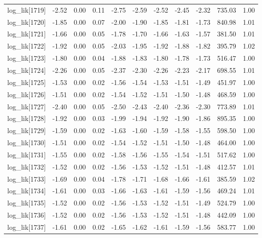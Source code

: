 \begin{table}[ht]
\begin{tabular}{rrrrrrrrrrr}
  log\_lik[1719] & -2.52 & 0.00 & 0.11 & -2.75 & -2.59 & -2.52 & -2.45 & -2.32 & 735.03 & 1.00 \\ 
  log\_lik[1720] & -1.85 & 0.00 & 0.07 & -2.00 & -1.90 & -1.85 & -1.81 & -1.73 & 840.98 & 1.01 \\ 
  log\_lik[1721] & -1.66 & 0.00 & 0.05 & -1.78 & -1.70 & -1.66 & -1.63 & -1.57 & 381.50 & 1.01 \\ 
  log\_lik[1722] & -1.92 & 0.00 & 0.05 & -2.03 & -1.95 & -1.92 & -1.88 & -1.82 & 395.79 & 1.02 \\ 
  log\_lik[1723] & -1.80 & 0.00 & 0.04 & -1.88 & -1.83 & -1.80 & -1.78 & -1.73 & 516.47 & 1.00 \\ 
  log\_lik[1724] & -2.26 & 0.00 & 0.05 & -2.37 & -2.30 & -2.26 & -2.23 & -2.17 & 698.55 & 1.01 \\ 
  log\_lik[1725] & -1.53 & 0.00 & 0.02 & -1.56 & -1.54 & -1.53 & -1.51 & -1.49 & 451.97 & 1.00 \\ 
  log\_lik[1726] & -1.51 & 0.00 & 0.02 & -1.54 & -1.52 & -1.51 & -1.50 & -1.48 & 468.59 & 1.00 \\ 
  log\_lik[1727] & -2.40 & 0.00 & 0.05 & -2.50 & -2.43 & -2.40 & -2.36 & -2.30 & 773.89 & 1.01 \\ 
  log\_lik[1728] & -1.92 & 0.00 & 0.03 & -1.99 & -1.94 & -1.92 & -1.90 & -1.86 & 895.35 & 1.00 \\ 
  log\_lik[1729] & -1.59 & 0.00 & 0.02 & -1.63 & -1.60 & -1.59 & -1.58 & -1.55 & 598.50 & 1.00 \\ 
  log\_lik[1730] & -1.51 & 0.00 & 0.02 & -1.54 & -1.52 & -1.51 & -1.50 & -1.48 & 464.00 & 1.00 \\ 
  log\_lik[1731] & -1.55 & 0.00 & 0.02 & -1.58 & -1.56 & -1.55 & -1.54 & -1.51 & 517.62 & 1.00 \\ 
  log\_lik[1732] & -1.52 & 0.00 & 0.02 & -1.56 & -1.53 & -1.52 & -1.51 & -1.48 & 412.57 & 1.01 \\ 
  log\_lik[1733] & -1.69 & 0.00 & 0.04 & -1.78 & -1.71 & -1.68 & -1.66 & -1.61 & 385.59 & 1.02 \\ 
  log\_lik[1734] & -1.61 & 0.00 & 0.03 & -1.66 & -1.63 & -1.61 & -1.59 & -1.56 & 469.24 & 1.01 \\ 
  log\_lik[1735] & -1.52 & 0.00 & 0.02 & -1.56 & -1.53 & -1.52 & -1.51 & -1.49 & 524.79 & 1.00 \\ 
  log\_lik[1736] & -1.52 & 0.00 & 0.02 & -1.56 & -1.53 & -1.52 & -1.51 & -1.48 & 442.09 & 1.00 \\ 
  log\_lik[1737] & -1.61 & 0.00 & 0.02 & -1.65 & -1.62 & -1.61 & -1.59 & -1.56 & 583.77 & 1.00 \\ 

\end{tabular}
\end{table}
